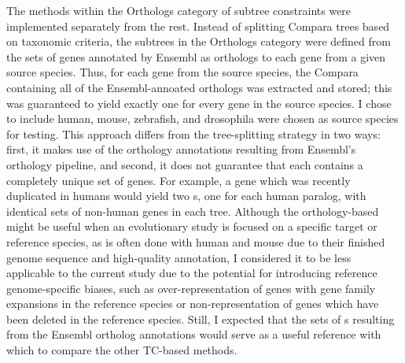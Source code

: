 The methods within the Orthologs category of subtree constraints were
implemented separately from the rest. Instead of splitting Compara
trees based on taxonomic criteria, the subtrees in the Orthologs
category were defined from the sets of genes annotated by Ensembl as
orthologs to each gene from a given source species. Thus, for each
gene from the source species, the Compara \subtr{} containing all of
the Ensembl-annoated orthologs was extracted and stored; this was
guaranteed to yield exactly one \subtr{} for every gene in the source
species. I chose to include human, mouse, zebrafish, and drosophila
were chosen as source species for testing. This approach differs from
the tree-splitting strategy in two ways: first, it makes use of the
orthology annotations resulting from Ensembl's orthology pipeline, and
second, it does not guarantee that each \subtr{} contains a completely
unique set of genes. For example, a gene which was recently duplicated
in humans would yield two \subtr{}s, one for each human paralog, with
identical sets of non-human genes in each tree. Although the
orthology-based might be useful when an evolutionary study is focused
on a specific target or reference species, as is often done with human
and mouse due to their finished genome sequence and high-quality
annotation, I considered it to be less applicable to the current study
due to the potential for introducing reference genome-specific biases,
such as over-representation of genes with gene family expansions in
the reference species or non-representation of genes which have been
deleted in the reference species. Still, I expected that the sets of
\subtr{}s resulting from the Ensembl ortholog annotations would serve
as a useful reference with which to compare the other TC-based
methods.

